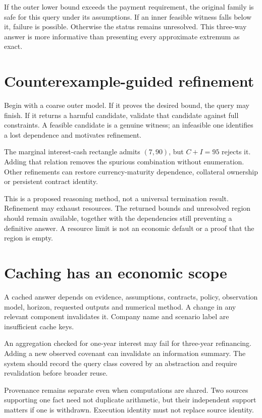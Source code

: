 If the outer lower bound exceeds the payment requirement, the original family is safe for this query under its assumptions. If an inner feasible witness falls below it, failure is possible. Otherwise the status remains unresolved. This three-way answer is more informative than presenting every approximate extremum as exact.

\section{Counterexample-guided refinement}
Begin with a coarse outer model. If it proves the desired bound, the query may finish. If it returns a harmful candidate, validate that candidate against full constraints. A feasible candidate is a genuine witness; an infeasible one identifies a lost dependence and motivates refinement.

The marginal interest-cash rectangle admits $(7,90)$, but $C+I=95$ rejects it. Adding that relation removes the spurious combination without enumeration. Other refinements can restore currency-maturity dependence, collateral ownership or persistent contract identity.

This is a proposed reasoning method, not a universal termination result. Refinement may exhaust resources. The returned bounds and unresolved region should remain available, together with the dependencies still preventing a definitive answer. A resource limit is not an economic default or a proof that the region is empty.

\section{Caching has an economic scope}
A cached answer depends on evidence, assumptions, contracts, policy, observation model, horizon, requested outputs and numerical method. A change in any relevant component invalidates it. Company name and scenario label are insufficient cache keys.

An aggregation checked for one-year interest may fail for three-year refinancing. Adding a new observed covenant can invalidate an information summary. The system should record the query class covered by an abstraction and require revalidation before broader reuse.

Provenance remains separate even when computations are shared. Two sources supporting one fact need not duplicate arithmetic, but their independent support matters if one is withdrawn. Execution identity must not replace source identity.

